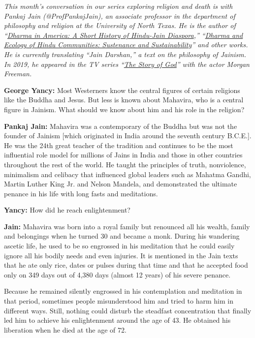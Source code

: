 \emph{This month's conversation in our series exploring religion and
death is with Pankaj Jain (@ProfPankajJain), an associate professor in
the department of philosophy and religion at the University of North
Texas. He is the author of
``}\href{https://www.routledge.com/Dharma-in-America-A-Short-History-of-Hindu-Jain-Diaspora/Jain/p/book/9781138565456}{\emph{Dharma
in America: A Short History of Hindu-Jain Diaspora}}\emph{,''
``}\href{http://www.amazon.com/Dharma-Ecology-Hindu-Communities-Sustainability/dp/1409405915/ref=sr_1_1?ie=UTF8\&s=books\&qid=1302198725\&sr=8-1}{\emph{Dharma
and Ecology of Hindu Communities: Sustenance and
Sustainability}}\emph{'' and other works. He is currently translating
``Jain Darshan,'' a text on the philosophy of Jainism. In 2019, he
appeared in the TV series
``}\href{https://www.netflix.com/watch/80178897?source=35}{\emph{The
Story of God}}\emph{'' with the actor Morgan Freeman.}

\textbf{George Yancy:} Most Westerners know the central figures of
certain religions like the Buddha and Jesus. But less is known about
Mahavira, who is a central figure in Jainism. What should we know about
him and his role in the religion?

\textbf{Pankaj Jain:} Mahavira was a contemporary of the Buddha but was
not the founder of Jainism {[}which originated in India around the
seventh century B.C.E.{]}. He was the 24th great teacher of the
tradition and continues to be the most influential role model for
millions of Jains in India and those in other countries throughout the
rest of the world. He taught the principles of truth, nonviolence,
minimalism and celibacy that influenced global leaders such as Mahatma
Gandhi, Martin Luther King Jr. and Nelson Mandela, and demonstrated the
ultimate penance in his life with long fasts and meditations.

\textbf{Yancy:} How did he reach enlightenment?

\textbf{Jain:} Mahavira was born into a royal family but renounced all
his wealth, family and belongings when he turned 30 and became a monk.
During his wandering ascetic life, he used to be so engrossed in his
meditation that he could easily ignore all his bodily needs and even
injuries. It is mentioned in the Jain texts that he ate only rice, dates
or pulses during that time and that he accepted food only on 349 days
out of 4,380 days (almost 12 years) of his severe penance.

Because he remained silently engrossed in his contemplation and
meditation in that period, sometimes people misunderstood him and tried
to harm him in different ways. Still, nothing could disturb the
steadfast concentration that finally led him to achieve his
enlightenment around the age of 43. He obtained his liberation when he
died at the age of 72.

